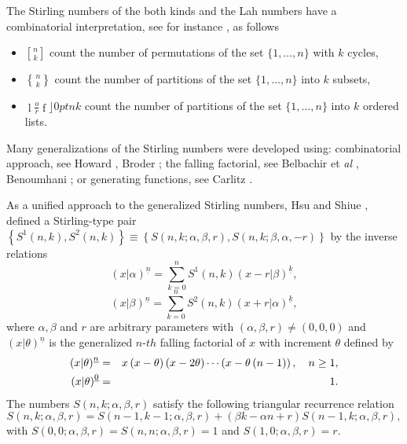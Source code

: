 \documentclass{article}
\newcommand {\stirlingf}[2]{\genfrac[]{0pt}{}{#1}{#2}}
\newcommand {\stirlings}[2]{\genfrac\{\}{0pt}{}{#1}{#2}}
\newcommand {\lah}[2]{\genfrac\lfloor \rfloor{0pt}{}{#1}{#2}}
\begin{document}
The Stirling numbers of the both kinds and the Lah numbers have a
combinatorial interpretation, see for instance \cite{BelBou14,BelBou12,BelBel13}%
, as follows
\begin{itemize}
\item $\stirlingf{n}{k}$ count the
number of permutations of the set $\{1,\ldots ,n\}$ with $k$ cycles,

\item $\stirlings{n}{k}$ count
the number of partitions of the set $\{1,\ldots ,n\}$ into $k$ subsets,

\item $\lah{n}{k}$ count the number of
partitions of the set $\{1,\ldots ,n\}$ into $k$ ordered lists.
\end{itemize}

Many generalizations of the Stirling numbers were developed using:
combinatorial approach, see Howard \cite{MR600368}, Broder \cite{MR743795};
the falling factorial, see Belbachir et \textit{al} \cite{MR25}, Benoumhani
\cite{MR1415279}; or generating functions, see Carlitz \cite{MR570168,
MR531621}.



As a unified approach to the generalized Stirling numbers, Hsu and Shiue
\cite{MR1618435}, defined a Stirling-type pair $\left\{ S^{1}\left(
n,k\right) ,S^{2}\left( n,k\right) \right\} \equiv \left\{ S\left(
n,k;\alpha ,\beta ,r\right) ,S\left( n,k;\beta ,\alpha ,-r\right) \right\} $
by the inverse relations%
\begin{equation}
\left( x|\alpha \right)^{\underline{n}}=\sum_{k=0}^{n}S^{1}\left( n,k\right) \left(
x-r|\beta \right)^{\underline{k}},
\end{equation}%
\begin{equation}
(x|\beta )^{\underline{n}}=\sum_{k=0}^{n}S^{2}\left( n,k\right) \left( x+r|\alpha
\right)^{\underline{k}},
\end{equation}
where $\alpha ,\beta $ and $r$ are arbitrary parameters with $\left( \alpha
,\beta ,r\right) \neq (0,0,0)$ and $\left( x|\theta \right) ^{\underline{n}}$
is the generalized $n$-$th$ falling factorial of $x$ with increment $\theta $
defined by
\begin{eqnarray*}
\left( x|\theta \right) ^{\underline{n}} &=&x\left( x-\theta \right) \left(
x-2\theta \right) \cdots \left( x-\theta \left( n-1\right) \right) ,\text{ \
\ }n\geq 1, \\
\left( x|\theta \right) ^{\underline{0}} &=&1.
\end{eqnarray*}
The numbers $S\left( n,k;\alpha ,\beta ,r\right) $ satisfy the following
triangular recurrence relation
\begin{equation*}
S\left( n,k;\alpha ,\beta ,r\right) =S\left( n-1,k-1;\alpha ,\beta ,r\right)
+\left( \beta k-\alpha n+r\right) S\left( n-1,k;\alpha ,\beta ,r\right) ,
\end{equation*}
with $S\left( 0,0;\alpha ,\beta ,r\right) =S\left( n,n;\alpha ,\beta
,r\right) =1$ and $S\left( 1,0;\alpha ,\beta ,r\right) =r.$
\end{document}
